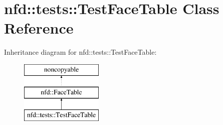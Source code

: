 \hypertarget{classnfd_1_1tests_1_1TestFaceTable}{}\section{nfd\+:\+:tests\+:\+:Test\+Face\+Table Class Reference}
\label{classnfd_1_1tests_1_1TestFaceTable}
Inheritance diagram for nfd\+:\+:tests\+:\+:Test\+Face\+Table\+:\begin{figure}[H]
\begin{center}
\leavevmode
\includegraphics[height=3.000000cm]{classnfd_1_1tests_1_1TestFaceTable}
\end{center}
\end{figure}
